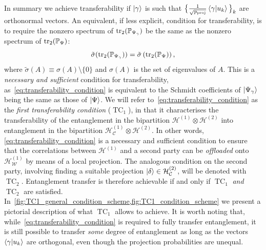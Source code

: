 \documentclass[
	aps, pra,
	superscriptaddress, twocolumn,
	floatfix,
	10pt
]{revtex4-1}
\newcommand{\on}[1]{\operatorname{#1}}
\newcommand{\parTitle}[1]{\noindent{\color{Mahogany}(\emph{#1})}}
\newcommand{\PP}{\mathbb{P}}
\newcommand{\calC}{{\mathcal{C}}}
\newcommand{\calH}{{\mathcal{H}}}
\newcommand{\calW}{{\mathcal{W}}}
\newcommand{\HC}{\calH_{\calC}}
\newcommand{\HW}{\calH_{\calW}}
\begin{document}
\parTitle{Summary of conclusions}
In summary we achieve transferability if $\ket\gamma$ is such that
$\big\{\frac{1}{\sqrt{p_{\on{proj}}}}\braket{\gamma}{u_k}\big\}_k$ are orthonormal vectors.
An equivalent, if less explicit, condition for transferability, is to require the nonzero spectrum of $\tr_2(\PP_{\Psi_\gamma})$ be the same as the nonzero spectrum of $\tr_2(\PP_\Psi)$:
\begin{equation}
    \tilde\sigma(\tr_2(\PP_{\Psi_\gamma})) =
    \tilde\sigma\left(
        \tr_2(\PP_\Psi)
    \right),
    \label{eq:transferability_condition}
\end{equation}
where $\tilde\sigma(A)\equiv\sigma(A)\setminus\{0\}$ and $\sigma(A)$ is the set of eigenvalues of $A$.
This is a \emph{necessary and sufficient} condition for transferability, as~\eqref{eq:transferability_condition} is equivalent to the Schmidt coefficients of $\ket{\Psi_\gamma}$ being the same as those of $\ket{\Psi}$.
We will refer to~\eqref{eq:transferability_condition} as the \emph{first transferability condition} ($\on{TC}_1$), in that it characterises the transferability of the entanglement in the bipartition $\calH^{(1)}\otimes\calH^{(2)}$ into entanglement in the bipartition $\HC^{(1)}\otimes\calH^{(2)}$.
In other words, \eqref{eq:transferability_condition} is a necessary and sufficient condition to ensure that the correlations between $\calH^{(1)}$ and a second party can be \emph{offloaded} onto $\HW^{(1)}$ by means of a local projection.
The analogous condition on the second party, involving finding a suitable projection $\ket\delta\in\HC^{(2)}$, will be denoted with $\on{TC}_2$.
Entanglement transfer is therefore achievable if and only if $\on{TC}_1$ \emph{and} $\on{TC}_2$ are satisfied.
In~\cref{fig:TC1_general_condition_scheme,fig:TC1_condition_scheme} we present a pictorial description of what $\on{TC}_1$ allows to achieve.
It is worth noting that, while~\cref{eq:transferability_condition} is required to fully transfer entanglement, it is still possible to transfer \textit{some} degree of entanglement as long as the vectors  $\braket{\gamma}{u_k}$ are orthogonal, even though the projection probabilities are unequal.
\end{document}
